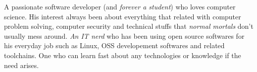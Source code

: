 

\begin{cvparagraph}

A passionate software developer (and \textit{forever a student}) who loves computer science. His interest always been about everything that related with computer problem solving, computer security and technical stuffs that \textit{normal mortals} don't usually mess around. \textit{An IT nerd} who has been using open source softwares for his everyday job such as Linux, OSS developement softwares and related toolchains. One who can learn fast about any technologies or knowledge if the need arises.
\end{cvparagraph}

